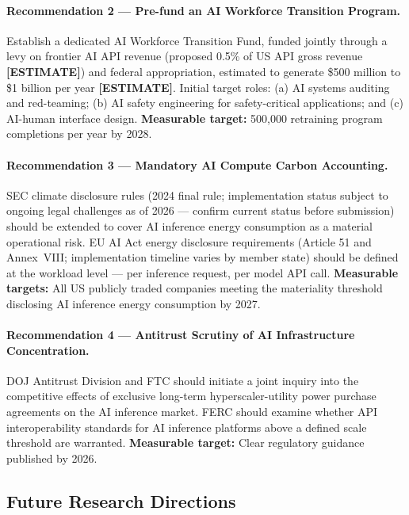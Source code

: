 \documentclass{article}
\newcommand{\ESTIMATE}{\textbf{[ESTIMATE]}}
\begin{document}
\paragraph{Recommendation 2 --- Pre-fund an AI Workforce Transition Program.}
Establish a dedicated AI Workforce Transition Fund, funded jointly through a levy on
frontier AI API revenue (proposed 0.5\% of US API gross revenue \ESTIMATE{}) and federal
appropriation, estimated to generate \$500 million to \$1 billion per year \ESTIMATE{}.
Initial target roles: (a) AI systems auditing and red-teaming; (b) AI safety engineering
for safety-critical applications; and (c) AI-human interface design. \textbf{Measurable
target:} 500,000 retraining program completions per year by 2028.

\paragraph{Recommendation 3 --- Mandatory AI Compute Carbon Accounting.}
SEC climate disclosure rules (2024 final rule; implementation status subject to ongoing legal challenges as of 2026 --- confirm current status before submission) should be extended to cover AI inference energy
consumption as a material operational risk. EU AI Act energy disclosure requirements
(Article 51 and Annex~VIII; implementation timeline varies by member state) should be defined at the workload level --- per inference request, per model API
call. \textbf{Measurable targets:} All US publicly traded companies meeting the
materiality threshold disclosing AI inference energy consumption by 2027.

\paragraph{Recommendation 4 --- Antitrust Scrutiny of AI Infrastructure Concentration.}
DOJ Antitrust Division and FTC should initiate a joint inquiry into the competitive
effects of exclusive long-term hyperscaler-utility power purchase agreements on the AI
inference market. FERC should examine whether API interoperability standards for AI
inference platforms above a defined scale threshold are warranted. \textbf{Measurable
target:} Clear regulatory guidance published by 2026.

\subsection{Future Research Directions}
\end{document}
